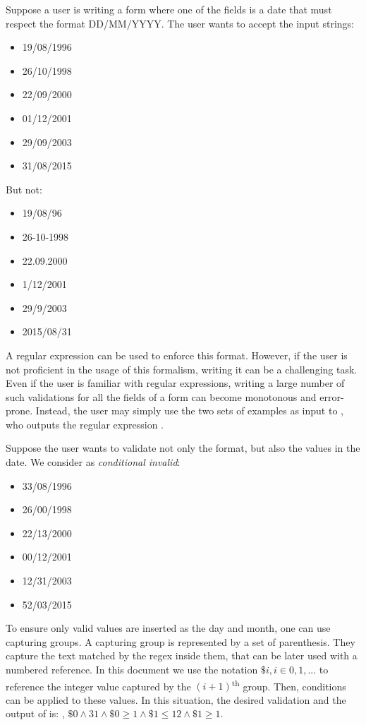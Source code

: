 Suppose a user is writing a form where one of the fields is a date that must respect the format DD/MM/YYYY.
The user wants to accept the input strings:
\begin{multicols}{3}
    \begin{itemize}[label={}]
    \item 19/08/1996
    \item 26/10/1998
    \item 22/09/2000
    \item 01/12/2001
    \item 29/09/2003
    \item 31/08/2015
    \end{itemize}
\end{multicols}
\noindent
But not:
\begin{multicols}{3}
\begin{itemize}[label={}]
\item 19/08/96
\item 26-10-1998
\item 22.09.2000
\item 1/12/2001
\item 29/9/2003
\item 2015/08/31
\end{itemize}
\end{multicols}
\noindent
A regular expression can be used to enforce this format. However, if the user is not proficient in the usage of this formalism, writing it can be a challenging task. Even if the user is familiar with regular expressions, writing a large number of such validations for all the fields of a form can become monotonous and error-prone.
Instead, the user may simply use the two sets of examples as input to \Forest{}, who outputs the regular expression .

Suppose the user wants to validate not only the format, but also the values in the date.
We consider as \textit{conditional invalid}:
\begin{multicols}{3}
    \begin{itemize}[label={}]
    \item 33/08/1996
    \item 26/00/1998
    \item 22/13/2000
    \item 00/12/2001
    \item 12/31/2003
    \item 52/03/2015
    \end{itemize}
\end{multicols}
To ensure only valid values are inserted as the day and month, one can use capturing groups. A capturing group is represented by a set of parenthesis. They capture the text matched by the regex inside them, that can be later used with a numbered reference. In this document we use the notation \(\$i, i \in 0, 1, ...\) to reference the integer value captured by the \((i+1)\)\textsuperscript{th} group.
Then, conditions can be applied to these values. In this situation, the desired validation and the output of \Forest is:
, \(\$0 \wedge 31 \wedge \$0 \ge 1 \wedge \$1 \le 12 \wedge \$1 \ge 1\).


